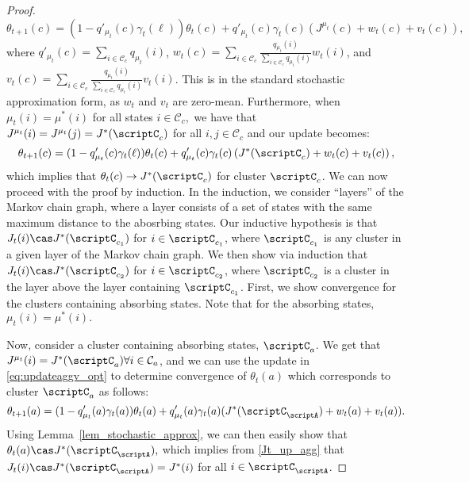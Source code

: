 \documentclass[12pt]{article}
\begin{document}
\begin{proof}
\begin{equation}
	\theta_{t+1}(c) = (1 - q'_{\mu_t}(c)\gamma_t(\ell))\theta_t(c) + q'_{\mu_t}(c)\gamma_t(c)\left(J^{\mu_t}(c) + w_t(c) + v_t(c)\right), \label{eq:updateaggv}
\end{equation}
where $q'_{\mu_t}(c)=\sum_{i \in \mathcal{C}_c} q_{\mu_t}(i)$, $w_t(c) = \sum_{i \in \mathcal{C}_c}\frac{q_{\mu_t}(i)}{\sum_{i \in \mathcal{C}_c} q_{\mu_t}(i)} w_t(i)$, and $v_t(c) = \sum_{i \in \mathcal{C}_c}\frac{q_{\mu_t}(i)}{\sum_{i \in \mathcal{C}_c} q_{\mu_t}(i)} v_t(i)$. This is in the standard stochastic approximation form, as $w_t$ and $v_t$ are zero-mean.
Furthermore, when $\mu_t(i)=\mu^*(i)$ for all states $i \in \mathcal{C}_c,$ we have that $J^{\mu_t}(i)=J^{\mu_t}(j)=J^*(\scriptC_c)$ for all $i,j\in \mathcal{C}_c$ and our update becomes:
\begin{equation}
	\theta_{t+1}(c) = (1 - q'_{\mu_t}(c)\gamma_t(\ell))\theta_t(c) + q'_{\mu_t}(c)\gamma_t(c)\left(J^*(\scriptC_c) + w_t(c) + v_t(c)\right), \label{eq:updateaggv_opt}
\end{equation}
which implies that $\theta_t(c)\to J^*(\scriptC_c)$ for cluster $\scriptC_c$. We can now proceed with the proof by induction. In the induction, we consider ``layers'' of the Markov chain graph, where a layer consists of a set of states with the same maximum distance to the abosrbing states. Our inductive hypothesis is that $J_t(i) \cas J^*(\scriptC_{c_1})$ for $i \in \scriptC_{c_1}$, where $\scriptC_{c_1}$ is any cluster in a given layer of the Markov chain graph. We then show via induction that $J_t(i) \cas J^*(\scriptC_{c_2})$ for $i \in \scriptC_{c_2}$, where $\scriptC_{c_2}$ is a cluster in the layer above the layer containing $\scriptC_{c_1}$. First, we show convergence for the clusters containing absorbing states. Note that for the absorbing states, $\mu_t(i)=\mu^*(i).$

Now, consider a cluster containing absorbing states, $\scriptC_a$. We get that $J^{\mu_t}(i) = J^*(\scriptC_a) \forall i \in \mathcal{C}_a$, and we can use the update in \eqref{eq:updateaggv_opt} to determine convergence of $\theta_t(a)$ which corresponds to cluster $\scriptC_a$ as follows: 
\begin{equation*}
\theta_{t+1}(a) = (1 - q'_{\mu_t}(a)\gamma_t(a))\theta_t(a) + q'_{\mu_t}(a)\gamma_t(a)(J^*(\scriptC_{\scriptA}) + w_t(a) + v_t(a)).
\end{equation*} 
Using Lemma~\ref{lem_stochastic_approx}, we can then easily show that $\theta_t(a) \cas J^*(\scriptC_{\scriptA}),$ which implies from \ref{Jt_up_agg} that $J_t(i) \cas J^*(\scriptC_{\scriptA}) = J^*(i)$ for all $i \in \scriptC_{\scriptA}$.


\end{proof}
\end{document}
